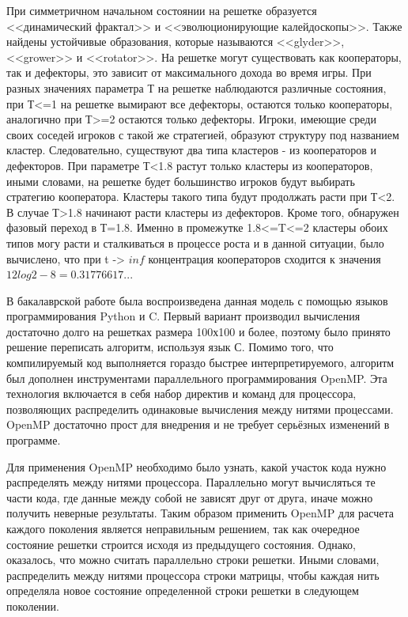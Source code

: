 \documentclass[14pt]{article}
\begin{document}
\par При симметричном начальном состоянии на решетке образуется <<динамический фрактал>> и <<эволюционирующие калейдоскопы>>. Также найдены устойчивые образования, которые называются <<glyder>>, <<grower>> и <<rotator>>.  На решетке могут существовать как кооператоры, так и дефекторы, это зависит от максимального дохода во время игры. При разных значениях параметра Т на решетке наблюдаются различные состояния, при Т<=1 на решетке вымирают все дефекторы, остаются только кооператоры, аналогично при Т>=2 остаются только дефекторы. Игроки, имеющие среди своих соседей игроков с такой же стратегией, образуют структуру под названием кластер. Следовательно, существуют два типа кластеров - из кооператоров и дефекторов. При параметре Т<1.8 растут только кластеры из кооператоров, иными словами, на решетке будет большинство игроков будут выбирать стратегию кооператора. Кластеры такого типа будут продолжать расти при Т<2. В случае Т>1.8 начинают расти кластеры из дефекторов. Кроме того, обнаружен фазовый переход в Т=1.8. Именно в промежутке 1.8<=T<=2 кластеры обоих типов могу расти и сталкиваться в процессе роста и в данной ситуации, было вычислено, что при t -> $inf$ концентрация кооператоров сходится к значения $12log2 - 8 = 0.31776617...$
\par В бакалаврской работе была воспроизведена данная модель с помощью языков программирования Python и C. Первый вариант производил вычисления достаточно долго на решетках размера 100х100 и более, поэтому было принято решение переписать алгоритм, используя язык С. Помимо того, что компилируемый код выполняется гораздо быстрее интерпретируемого, алгоритм был дополнен инструментами параллельного программирования OpenMP. Эта технология включается в себя набор директив и команд для процессора, позволяющих распределить одинаковые вычисления между нитями процессами. OpenMP достаточно прост для внедрения и не требует серьёзных изменений в программе.
\par Для применения OpenMP необходимо было узнать, какой участок кода нужно распределять между нитями процессора. Параллельно могут вычисляться те части кода, где данные между собой не зависят друг от друга, иначе можно получить неверные результаты. Таким образом применить OpenMP для расчета каждого поколения является неправильным решением, так как очередное состояние решетки строится исходя из предыдущего состояния. Однако, оказалось, что можно считать параллельно строки решетки. Иными словами, распределить между нитями процессора строки матрицы, чтобы каждая нить определяла новое состояние определенной строки решетки в следующем поколении.
\end{document}
